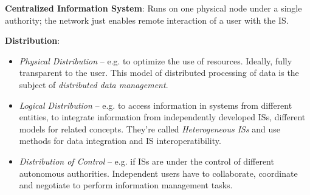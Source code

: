 
\textbf{Centralized Information System}: Runs on one physical node under a single authority; the network just enables remote interaction of a user with the IS.

\textbf{Distribution}:
\begin{itemize}
	\item \emph{Physical Distribution} -- e.g. to optimize the use of resources. Ideally, fully transparent to the user. This model of distributed processing of data is the subject of \emph{distributed data management}.
	\item \emph{Logical Distribution} -- e.g. to access information in systems from different entities, to integrate information from independently developed ISs, different models for related concepts. They're called \emph{Heterogeneous ISs} and use methods for data integration and IS interoperatibility.
	\item \emph{Distribution of Control} -- e.g. if ISs are under the control of different autonomous authorities. Independent users have to collaborate, coordinate and negotiate to perform information management tasks.
\end{itemize}

